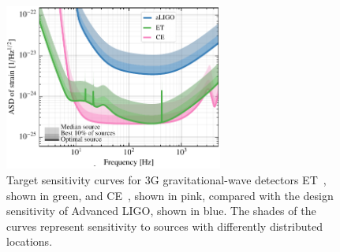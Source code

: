 




\begin{figure}
\centering
\includegraphics*[width= 0.64\textwidth]{Figures/noises_percentiles-Voyager.pdf}
\caption{Target sensitivity curves for \ac{3G} gravitational-wave detectors \acf{ET}~\cite{ET2011}, shown in green, and \acf{CE}~\cite{CosmicExplorer2017}, shown in pink, compared with the design sensitivity of Advanced LIGO, shown in blue. 
The shades of the curves represent sensitivity to sources with differently distributed locations.}
\label{fig:3GSens}
\end{figure}



